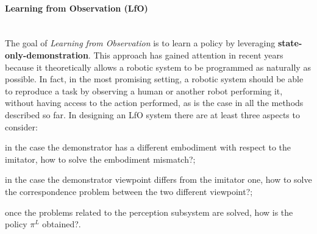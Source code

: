 \paragraph{Learning from Observation (LfO)} \mbox{} \\
\label{sec:lfo}
The goal of \textit{Learning from Observation} is to learn a policy by leveraging \textbf{state-only-demonstration}. This approach has gained attention in recent years because it theoretically allows a robotic system to be programmed as naturally as possible. In fact, in the most promising setting, a robotic system should be able to reproduce a task by observing a human or another robot performing it, without having access to the action performed, as is the case in all the methods described so far. In designing an LfO system there are at least three aspects to consider: \begin{enumerate*}[label=\textbf{(\arabic*)}]
    \item in the case the demonstrator has a different embodiment with respect to the imitator, how to solve the embodiment mismatch?;
    \item in the case the demonstrator viewpoint differs from the imitator one, how to solve the correspondence problem between the two different viewpoint?;
    \item once the problems related to the perception subsystem are solved, how is the policy $\pi^{L}$ obtained?. 
\end{enumerate*}


